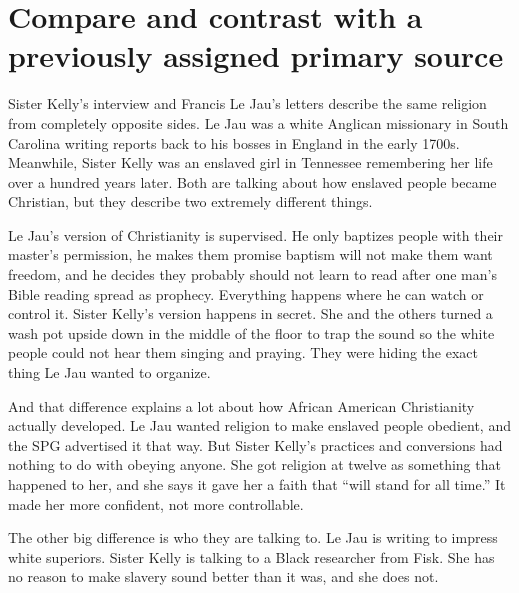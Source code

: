 \documentclass[12pt]{article}
\begin{document}
\section*{Compare and contrast with a previously assigned primary source}

Sister Kelly's interview and Francis Le Jau's letters describe the same religion from completely opposite sides. Le Jau was a white Anglican missionary in South Carolina writing reports back to his bosses in England in the early 1700s. Meanwhile, Sister Kelly was an enslaved girl in Tennessee remembering her life over a hundred years later. Both are talking about how enslaved people became Christian, but they describe two extremely different things.

Le Jau's version of Christianity is supervised. He only baptizes people with their master's permission, he makes them promise baptism will not make them want freedom, and he decides they probably should not learn to read after one man's Bible reading spread as prophecy. Everything happens where he can watch or control it. Sister Kelly's version happens in secret. She and the others turned a wash pot upside down in the middle of the floor to trap the sound so the white people could not hear them singing and praying. They were hiding the exact thing Le Jau wanted to organize.

And that difference explains a lot about how African American Christianity actually developed. Le Jau wanted religion to make enslaved people obedient, and the SPG advertised it that way. But Sister Kelly's practices and conversions had nothing to do with obeying anyone. She got religion at twelve as something that happened to her, and she says it gave her a faith that ``will stand for all time.'' It made her more confident, not more controllable.

The other big difference is who they are talking to. Le Jau is writing to impress white superiors. Sister Kelly is talking to a Black researcher from Fisk. She has no reason to make slavery sound better than it was, and she does not.
\end{document}
